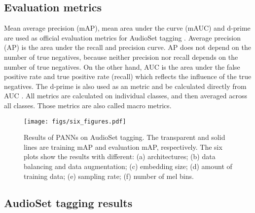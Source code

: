 \documentclass[journal]{IEEEtran}
\begin{document}
\subsection{Evaluation metrics}
Mean average precision (mAP), mean area under the curve (mAUC) and d-prime are used as official evaluation metrics for AudioSet tagging \cite{kong2019weakly}\cite{gemmeke2017audio}. Average precision (AP) is the area under the recall and precision curve. AP does not depend on the number of true negatives, because neither precision nor recall depends on the number of true negatives. On the other hand, AUC is the area under the false positive rate and true positive rate (recall) which reflects the influence of the true negatives. The d-prime \cite{gemmeke2017audio} is also used as an metric and be calculated directly from AUC \cite{gemmeke2017audio}. All metrics are calculated on individual classes, and then averaged across all classes. Those metrics are also called macro metrics. 


\begin{figure*}[t]
  \centering
  \centerline{\texttt{[image: figs/six\_figures.pdf]}}
  \caption{Results of PANNs on AudioSet tagging. The transparent and solid lines are training mAP and evaluation mAP, respectively. The six plots show the results with different: (a) architectures; (b) data balancing and data augmentation; (c) embedding size; (d) amount of training data; (e) sampling rate; (f) number of mel bins.}
  \label{fig:six_figures}
\end{figure*}


\subsection{AudioSet tagging results}
\end{document}
